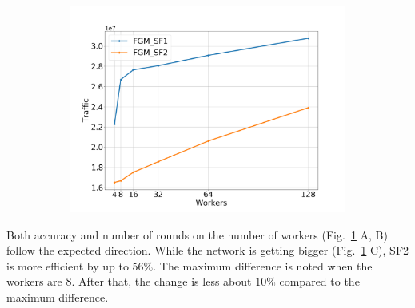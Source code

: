 \begin{figure}[H]
\begin{subfigure}[b]{0.50\textwidth}
        \includegraphics[width=\textwidth]{./images/results/sf-comp/exp_Fig_3_3.png}
        \caption{}
    \end{subfigure}
    \caption{}
    \label{fig:sf_3}
\end{figure}

Both accuracy and number of rounds on the number of workers (Fig.~\ref{fig:sf_3} A, B) follow the expected direction.
While the network is getting bigger (Fig.~\ref{fig:sf_3} C), SF2 is more efficient by up to $56\%$.
The maximum difference is noted when the workers are $8$.
After that, the change is less about $10\%$ compared to the maximum difference.

